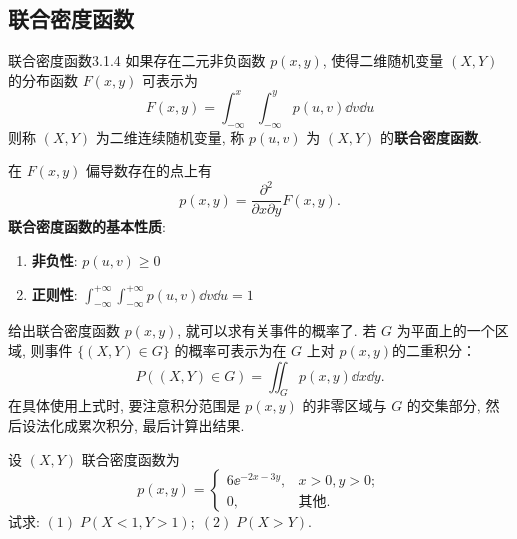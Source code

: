    \subsection{联合密度函数}\label{ssec:3.1.4}
   \begin{definition}{联合密度函数}{3.1.4}
   	如果存在二元非负函数 $p(x,y)$, 使得二维随机变量 $(X,Y)$ 的分布函数 $F(x,y)$ 可表示为
   	\begin{equation}\label{eq:3.1.3}
   	 	F(x, y)=\int_{-\infty}^{x} \int_{-\infty}^{y} p(u, v) \dd v \dd u
   	\end{equation}
   	则称 $(X,Y)$ 为二维连续随机变量, 称 $p(u,v)$ 为 $(X,Y)$ 的\textbf{联合密度函数}.
   \end{definition}
   在 $F(x,y)$ 偏导数存在的点上有
   \[
    	p(x, y)=\frac{\partial^{2}}{\partial x \partial y} F(x, y).
   \]
   \textbf{联合密度函数的基本性质}:
   \begin{enumerate}
   	\item \textbf{非负性}: $p(u,v)\geq 0$
   	\item \textbf{正则性}: $\int_{-\infty}^{+\infty} \int_{-\infty}^{+\infty} p(u, v) \dd v \dd u=1$
   \end{enumerate}
   给出联合密度函数 $p(x,y)$, 就可以求有关事件的概率了. 若 $G$ 为平面上的一个区域,
   则事件 $\{(X,Y) \in G\}$ 的概率可表示为在 $G$ 上对 $p(x,y)$的二重积分：
   \begin{equation}\label{eq:3.1.4}
    	P((X, Y) \in G)=\iint_{G} p(x, y) \dd x \dd y.
   \end{equation}
   在具体使用上式时, 要注意积分范围是 $p(x,y)$ 的非零区域与 $G$ 的交集部分, 然后设法化成累次积分, 最后计算出结果.
   \begin{example}\label{exam:3.1.3}
   		设 $(X,Y)$ 联合密度函数为
   		\[
   		p(x, y)=
   		\begin{cases}
   		6 \ee^{-2 x-3 y}, & x>0, y>0; \\
   		0, & \text{其他} .
   		\end{cases}
   		\]
   		试求: $(1)\; P(X<1,Y>1); \; (2)\; P(X>Y)$.
   \end{example}
